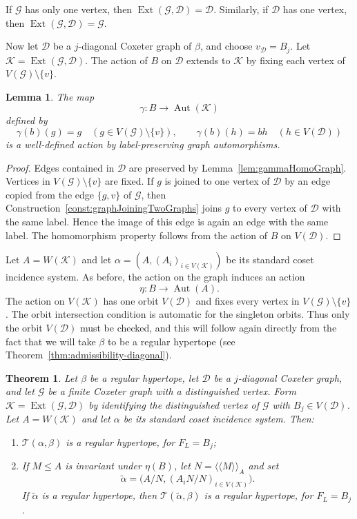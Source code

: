 \documentclass[11pt,letterpaper]{amsart}
\newtheorem{thm}[prop]{Theorem}
\newtheorem{lemma}[prop]{Lemma}
\DeclareMathOperator{\Aut}{Aut}
\newcommand{\GG}{\mathcal{G}}
\newcommand{\KK}{\mathcal{K}}
\newcommand{\TT}{\mathcal{T}}
\newcommand{\EXT}{\operatorname{Ext}}
\begin{document}
If $\GG$ has only one vertex, then $\EXT(\GG,\mathcal{D})=\mathcal{D}$. Similarly, if $\mathcal{D}$ has one vertex, then $\EXT(\GG,\mathcal{D})=\GG$.

Now let $\mathcal{D}$ be a $j$-diagonal Coxeter graph of $\beta$, and choose $v_\mathcal{D}=B_j$. Let $\KK=\EXT(\GG,\mathcal{D})$. The action of $B$ on $\mathcal{D}$ extends to $\KK$ by fixing each vertex of $V(\GG)\setminus\{v\}$.

\begin{lemma}\label{lem:gammaHomoExtendedGraph}
The map
\[
\gamma:B\longrightarrow\Aut(\KK)
\]
defined by
\[
\gamma(b)(g)=g\quad(g\in V(\GG)\setminus\{v\}),
\qquad
\gamma(b)(h)=bh\quad(h\in V(\mathcal{D}))
\]
is a well-defined action by label-preserving graph automorphisms.
\end{lemma}

\begin{proof}
Edges contained in $\mathcal{D}$ are preserved by Lemma~\ref{lem:gammaHomoGraph}. Vertices in $V(\GG)\setminus\{v\}$ are fixed. If $g$ is joined to one vertex of $\mathcal{D}$ by an edge copied from the edge $\{g,v\}$ of $\GG$, then Construction~\ref{const:graphJoiningTwoGraphs} joins $g$ to every vertex of $\mathcal{D}$ with the same label. Hence the image of this edge is again an edge with the same label. The homomorphism property follows from the action of $B$ on $V(\mathcal{D})$.
\end{proof}

Let $A=W(\KK)$ and let $\alpha=(A,(A_i)_{i\in V(\KK)})$ be its standard coset incidence system. As before, the action on the graph induces an action
\[
\eta:B\longrightarrow\Aut(A).
\]
The action on $V(\KK)$ has one orbit $V(\mathcal{D})$ and fixes every vertex in $V(\GG)\setminus\{v\}$. The orbit intersection condition is automatic for the singleton orbits. Thus only the orbit $V(\mathcal{D})$ must be checked, and this will follow again directly from the fact that we will take $\beta$ to be a regular hypertope (see Theorem~\ref{thm:admissibility-diagonal}).

\begin{thm}\label{thm:extended-twisting}
Let $\beta$ be a regular hypertope, let $\mathcal{D}$ be a $j$-diagonal Coxeter graph, and let $\GG$ be a finite Coxeter graph with a distinguished vertex. Form $\KK=\EXT(\GG,\mathcal{D})$ by identifying the distinguished vertex of $\GG$ with $B_j\in V(\mathcal{D})$. Let $A=W(\KK)$ and let $\alpha$ be its standard coset incidence system. Then:
\begin{enumerate}
    \item $\TT(\alpha,\beta)$ is a regular hypertope, for $F_L=B_j$;
    \item If $M\leq A$ is invariant under $\eta(B)$, let $N=\langle\!\langle M\rangle\!\rangle_A$ and set
    \[
    \widetilde\alpha=
    \bigl(A/N,(A_iN/N)_{i\in V(\KK)}\bigr).
    \]
    If $\widetilde\alpha$ is a regular hypertope, then $\TT(\widetilde\alpha,\beta)$ is a regular hypertope, for $F_L=B_j$.
\end{enumerate}
\end{thm}
\end{document}
